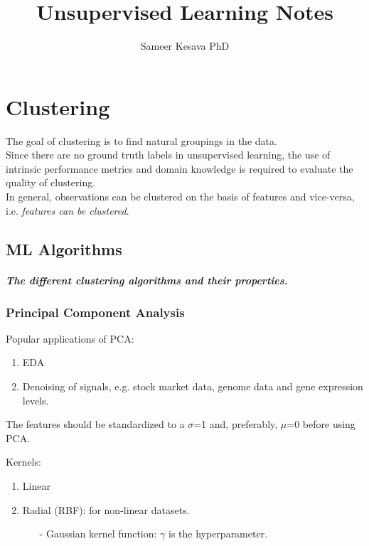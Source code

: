 \documentclass[a4paper, 12pt]{report}
\begin{document}
\title{Unsupervised Learning Notes}
\author{Sameer Kesava PhD}
\date{} %
\maketitle

\tableofcontents
\newpage



\chapter{Clustering}
The goal of clustering is to find natural groupings in the data.
\\

Since there are no ground truth labels in unsupervised learning, the use of intrinsic performance metrics and domain knowledge is required to evaluate the quality of clustering.\\

In general, observations can be clustered on the basis of features and vice-versa, i.e. \textit{features can be clustered}.
\section{ML Algorithms}
\paragraph{The different clustering algorithms and their properties.}

\subsection{Principal Component Analysis}
\label{PCA}

Popular applications of PCA:
\begin{enumerate}
\item EDA
\item Denoising of signals, e.g. stock market data, genome data and gene expression levels.
\end{enumerate}

The features should be standardized to a $\sigma$=1 and, preferably, $\mu$=0 before using PCA. 

\vspace{12pt}
Kernels:
\begin{enumerate} %

\item Linear
\item Radial (RBF): for non-linear datasets.
\begin{itemize}
\item[-] Gaussian kernel function: $\gamma$ is the hyperparameter.
\end{itemize}

\end{enumerate}
\end{document}
